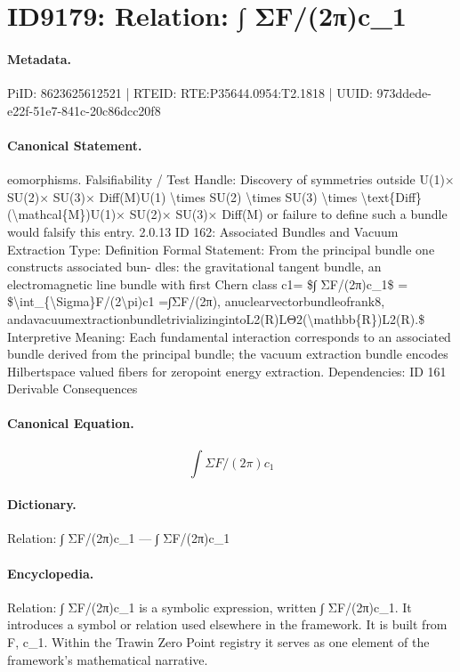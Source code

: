 \section*{ID9179: Relation: ∫ ΣF/(2π)c\_1}
\paragraph{Metadata.}
PiID: 8623625612521 | RTEID: RTE:P35644.0954:T2.1818 | UUID: 973ddede-e22f-51e7-841c-20c86dcc20f8

\paragraph{Canonical Statement.}
eomorphisms. Falsifiability / Test Handle: Discovery of symmetries outside U(1)× SU(2)× SU(3)× Diff(M)U(1) \textbackslash{}times SU(2) \textbackslash{}times SU(3) \textbackslash{}times \textbackslash{}text\{Diff\}(\textbackslash{}mathcal\{M\})U(1)× SU(2)× SU(3)× Diff(M) or failure to define such a bundle would falsify this entry. 2.0.13 ID 162: Associated Bundles and Vacuum Extraction Type: Definition Formal Statement: From the principal bundle one constructs associated bun- dles: the gravitational tangent bundle, an electromagnetic line bundle with first Chern class c1= \$∫ ΣF/(2π)c\_1\$ = \$\textbackslash{}int\_\{\textbackslash{}Sigma\}F/(2\textbackslash{}pi)c1 =∫ΣF/(2π), anuclearvectorbundleofrank8, andavacuumextractionbundletrivializingintoL2(R)LΘ2(\textbackslash{}mathbb\{R\})L2(R).\$ Interpretive Meaning: Each fundamental interaction corresponds to an associated bundle derived from the principal bundle; the vacuum extraction bundle encodes Hilbertspace valued fibers for zeropoint energy extraction. Dependencies: ID 161 Derivable Consequences

\paragraph{Canonical Equation.}
\[
∫ ΣF/(2π)c_1
\]

\paragraph{Dictionary.}
Relation: ∫ ΣF/(2π)c\_1 — ∫ ΣF/(2π)c\_1

\paragraph{Encyclopedia.}
Relation: ∫ ΣF/(2π)c\_1 is a symbolic expression, written ∫ ΣF/(2π)c\_1. It introduces a symbol or relation used elsewhere in the framework. It is built from F, c\_1. Within the Trawin Zero Point registry it serves as one element of the framework's mathematical narrative.
